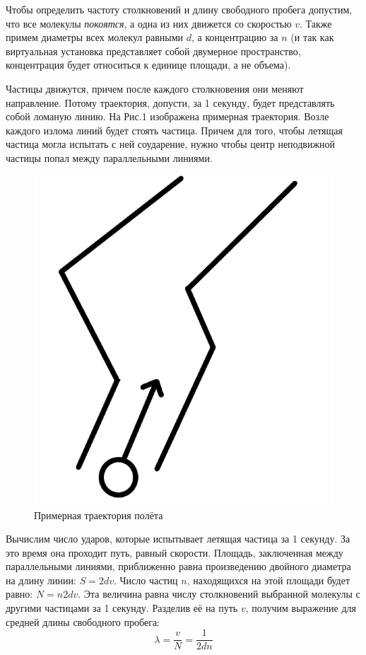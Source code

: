 \documentclass[a4paper,12pt]{article}
\begin{document}
Чтобы определить частоту столкновений и длину свободного пробега допустим, что все молекулы \textit{покоятся}, а одна из них движется со скоростью $v$. Также примем диаметры всех молекул равными $d$, а концентрацию за $n$ (и так как виртуальная установка представляет собой двумерное пространство, концентрация будет относиться к единице площади, а не объема).

Частицы движутся, причем после каждого столкновения они меняют направление. Потому траектория, допусти, за 1 секунду, будет представлять собой ломаную линию. На Рис.1 изображена примерная траектория. Возле каждого излома линий будет стоять частица. Причем для того, чтобы летящая частица могла испытать с ней соударение, нужно чтобы центр неподвижной частицы попал между параллельными линиями.

\begin{figure}[h!]
	\begin{center}
		\includegraphics[scale=0.2]{1}
	\end{center}
	\caption{Примерная траектория полёта}
\end{figure}

\newpage

Вычислим число ударов, которые испытывает летящая частица за 1 секунду. За это время она проходит путь, равный скорости. Площадь, заключенная между параллельными линиями, приближенно равна произведению двойного диаметра на длину линии: $S = 2dv$. Число частиц $n$, находящихся на этой площади будет равно: $N = n2dv$. Эта величина равна числу столкновений выбранной молекулы с другими частицами за 1 секунду. Разделив её на путь $v$, получим выражение для средней длины свободного пробега:
\begin{equation}\label{rab_form}
\lambda = \frac{v}{N} = \frac{1}{2dn}
\end{equation}
\end{document}
